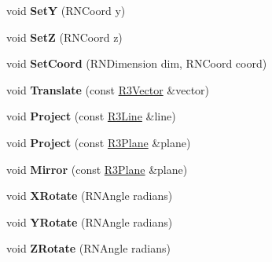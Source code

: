 \begin{DoxyCompactItemize}
\item 
void {\bfseries SetY} (R\+N\+Coord y)\hypertarget{class_r3_point_aa2afe35e40bd115f324aa12f74972efa}{}\label{class_r3_point_aa2afe35e40bd115f324aa12f74972efa}

\item 
void {\bfseries SetZ} (R\+N\+Coord z)\hypertarget{class_r3_point_a9f4bf3bf08edd7192284535489ade7d9}{}\label{class_r3_point_a9f4bf3bf08edd7192284535489ade7d9}

\item 
void {\bfseries Set\+Coord} (R\+N\+Dimension dim, R\+N\+Coord coord)\hypertarget{class_r3_point_a944a1d08e690888bb8243a6e54a9bb0b}{}\label{class_r3_point_a944a1d08e690888bb8243a6e54a9bb0b}

\item 
void {\bfseries Translate} (const \hyperlink{class_r3_vector}{R3\+Vector} \&vector)\hypertarget{class_r3_point_a2c268a081395e787f14a93df83bbdb6d}{}\label{class_r3_point_a2c268a081395e787f14a93df83bbdb6d}

\item 
void {\bfseries Project} (const \hyperlink{class_r3_line}{R3\+Line} \&line)\hypertarget{class_r3_point_a124f2a7cd3a789b74a06c7721ed905bd}{}\label{class_r3_point_a124f2a7cd3a789b74a06c7721ed905bd}

\item 
void {\bfseries Project} (const \hyperlink{class_r3_plane}{R3\+Plane} \&plane)\hypertarget{class_r3_point_a57788221c32d35010ecf3d82422ebe90}{}\label{class_r3_point_a57788221c32d35010ecf3d82422ebe90}

\item 
void {\bfseries Mirror} (const \hyperlink{class_r3_plane}{R3\+Plane} \&plane)\hypertarget{class_r3_point_a79a572f7b95d56abf73a4c9e3c7ee74b}{}\label{class_r3_point_a79a572f7b95d56abf73a4c9e3c7ee74b}

\item 
void {\bfseries X\+Rotate} (R\+N\+Angle radians)\hypertarget{class_r3_point_a68dde7c7b99134178eee6231b148d0e0}{}\label{class_r3_point_a68dde7c7b99134178eee6231b148d0e0}

\item 
void {\bfseries Y\+Rotate} (R\+N\+Angle radians)\hypertarget{class_r3_point_ad4a834b388986a66361ca0540d81acb8}{}\label{class_r3_point_ad4a834b388986a66361ca0540d81acb8}

\item 
void {\bfseries Z\+Rotate} (R\+N\+Angle radians)\hypertarget{class_r3_point_ad6dc24e06feb116e5e322e4a34bd8b62}{}\label{class_r3_point_ad6dc24e06feb116e5e322e4a34bd8b62}


\end{DoxyCompactItemize}
